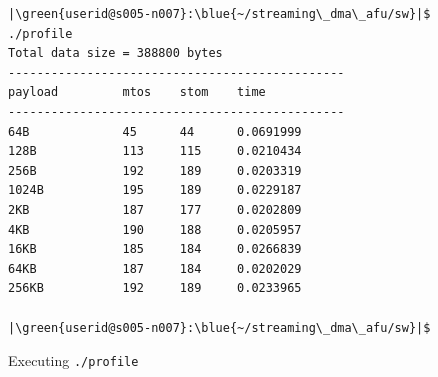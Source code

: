 \documentclass[epsfig,10pt,fullpage]{article}
\begin{document}
\begin{enumerate}
\begin{figure}[h]
\begin{center}
\begin{minipage}[h]{\textwidth}
\begin{lstlisting}[name=output]
|\green{userid@s005-n007}:\blue{~/streaming\_dma\_afu/sw}|$ ./profile
Total data size = 388800 bytes
-----------------------------------------------
payload         mtos    stom    time
-----------------------------------------------
64B             45      44      0.0691999
128B            113     115     0.0210434
256B            192     189     0.0203319
1024B           195     189     0.0229187
2KB             187     177     0.0202809
4KB             190     188     0.0205957
16KB            185     184     0.0266839
64KB            187     184     0.0202029
256KB           192     189     0.0233965

|\green{userid@s005-n007}:\blue{~/streaming\_dma\_afu/sw}|$
\end{lstlisting}
\end{minipage}
\caption{Executing \texttt{./profile}}
\label{fig:output}
\end{center}
\end{figure}
    
\end{enumerate}
\end{document}
